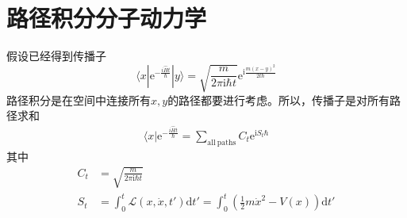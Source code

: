     \section{路径积分分子动力学}

        假设已经得到传播子
        \begin{equation}
            \langle x | \mathrm{e}^{-\frac {i \hat{H}t}{\hbar}} |y \rangle = \sqrt{\frac m{2\pi \mathrm{i}\hbar t}} \mathrm{e}^{\mathrm{i}\frac {m(x-y)^2}{2t\hbar}}
        \end{equation}
        路径积分是在空间中连接所有$x,y$的路径都要进行考虑。所以，传播子是对所有路径求和
        \begin{equation}\begin{aligned}
            \langle x | \mathrm{e}^{-\frac {i \hat{H}t}{\hbar}} = \sum_{\mathrm{all~paths}} C_t \mathrm{e}^{\mathrm{i}S_t\hbar}
        \end{aligned}\end{equation}
        其中 
        \begin{equation}\begin{aligned}
            C_t &= \sqrt{\frac m{2\pi \mathrm{i}\hbar t}} \\
            S_t &= \int_0^t \mathcal{L}(x,\dot{x},t') \mathrm{d}t' = \int_0^t (\frac 12 m \dot{x}^2 - V(x)) \mathrm{d}t'
        \end{aligned}\end{equation}

